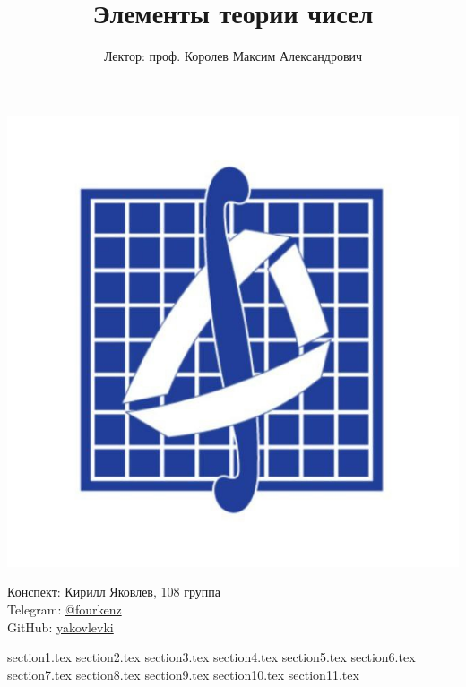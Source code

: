 \documentclass[a4paper, 12pt]{article}
\title{\textbf{Элементы теории чисел}}
\author{Лектор: проф. Королев Максим Александрович}
\theoremstyle{definition}
\begin{document}
    
    \fontsize{14pt}{20pt}\selectfont
    \maketitle
    \vspace{0.3cm}
    \begin{center}
        \includegraphics[width=0.75\linewidth]{Pictures/mehmat.png}
    \end{center}
    \vspace{1.5cm}
    \begin{center}
        Конспект: Кирилл Яковлев, 108 группа\\
        Telegram: \href{https://t.me/fourkenz}{@fourkenz}\\
        GitHub: \href{https://github.com/yakovlevki}{yakovlevki}\\
    \end{center}
        
    \newpage
    \tableofcontents
    \fontsize{14pt}{20pt}\selectfont
    \newpage

    {section1.tex}
    {section2.tex}
    {section3.tex}
    {section4.tex}
    {section5.tex}
    {section6.tex}
    {section7.tex}
    {section8.tex}
    {section9.tex}
    {section10.tex}
    {section11.tex}

    
\end{document}
